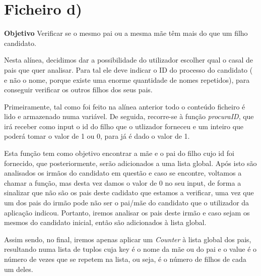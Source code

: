 \documentclass[11pt,a4paper]{report}
\begin{document}
	\section*{Ficheiro d)}
	\textbf{Objetivo} Verificar se o mesmo pai ou a mesma mãe têm mais do que um filho candidato.
\vspace{0.5cm}

	\qquad Nesta alínea, decidimos dar a possibilidade do utilizador escolher qual o casal de pais que quer analisar. Para tal ele deve indicar o ID do processo do candidato ( e não o nome, porque existe uma enorme quantidade de nomes repetidos), para conseguir verificar os outros filhos dos seus pais.\par
	\qquad Primeiramente, tal como foi feito na alínea anterior todo o conteúdo ficheiro é lido e armazenado numa variável. De seguida, recorre-se à função \textit{procuraID}, que irá receber como input o id do filho que o utlizador forneceu e um inteiro que poderá tomar o valor de 1 ou 0, para já é dado o valor de 1.\par
	\qquad Esta função tem como objetivo encontrar a mãe e o pai do filho cujo id foi fornecido, que posteriormente, serão adicionados a uma lista global. Após isto são analisados os irmãos do candidato em questão e caso se encontre, voltamos a chamar a função, mas desta vez damos o valor de 0 no seu input, de forma a sinalizar que não são os pais deste cadidato que estamos a verificar, uma vez que um dos pais do irmão pode não ser o pai/mãe do candidato que o utilizador da aplicação indicou. Portanto, iremos analisar os pais deste irmão e caso sejam os mesmos do candidato inicial, então são adicionados à lista global.\par
	\qquad Assim sendo, no final, iremos apenas aplicar um \textit{Counter} à lista global dos pais, resultando numa lista de tuplos cuja key é o nome da mãe ou do pai e o value é o número de vezes que se repetem na lista, ou seja, é o número de filhos de cada um deles.\par

\vspace{0.5cm}
\end{document}
